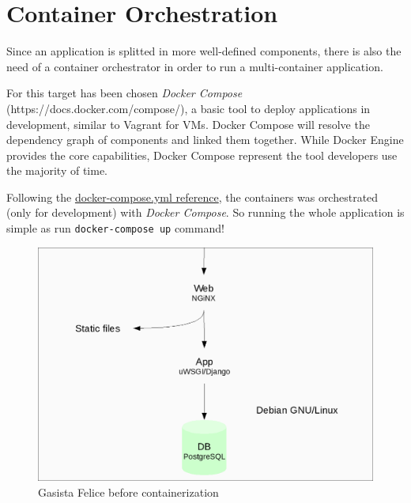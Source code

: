\section{Container Orchestration}\label{container-orchestration}

Since an application is splitted in more well-defined components, there
is also the need of a container orchestrator in order to run a multi-container application.

For this target has been chosen \emph{Docker Compose}
(https://docs.docker.com/compose/), a basic tool to deploy applications
in development, similar to Vagrant for VMs. Docker Compose will resolve
the dependency graph of components and linked them together. While
Docker Engine provides the core capabilities, Docker Compose represent
the tool developers use the majority of time.

Following the \href{https://docs.docker.com/compose/yml/}{docker-compose.yml reference}, the containers was orchestrated
(only for development) with \emph{Docker Compose}. So running the whole
application is simple as run \texttt{docker-compose\ up} command!

\begin{figure}[htbp]
\centering
\includegraphics{media/ch3-gf_old.png}
\caption{Gasista Felice before containerization}
\end{figure}

